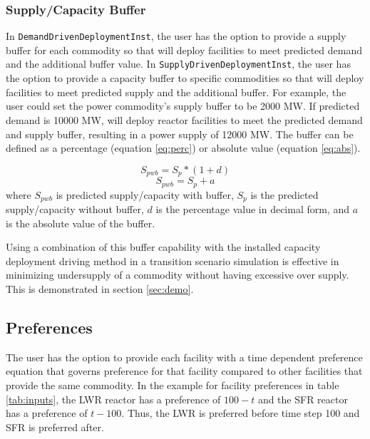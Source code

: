 \subsubsection{Supply/Capacity Buffer}
In \texttt{DemandDrivenDeploymentInst}, the user has the option 
to provide a supply buffer for each commodity so that 
\deploy will deploy facilities to meet predicted demand and the
additional buffer value. 
In \texttt{SupplyDrivenDeploymentInst}, the user has the option 
to provide a capacity buffer to specific commodities so that 
\deploy will deploy facilities to meet predicted supply and the
additional buffer.
For example, the user could set the power commodity's supply buffer 
to be 2000 MW. 
If predicted demand is 10000 MW, \deploy will deploy reactor 
facilities to meet the predicted demand and supply buffer, resulting 
in a power supply of 12000 MW.  
The buffer can be defined as a percentage (equation \ref{eq:perc}) 
or absolute value (equation \ref{eq:abs}). 

\begin{equation}
    \label{eq:perc}
    S_{pwb} = S_{p}*(1+d)
\end{equation}
\begin{equation}
    \label{eq:abs}
    S_{pwb} = S_{p}+a
\end{equation}
where $S_{pwb}$ is predicted supply/capacity with buffer, 
$S_p$ is the predicted supply/capacity without buffer, 
$d$ is the percentage value in decimal form, 
and $a$ is the absolute value of the buffer. 

Using a combination of this buffer capability with the 
installed capacity deployment driving method in a transition 
scenario simulation is effective in minimizing undersupply of a 
commodity without having excessive over supply. 
This is demonstrated in section \ref{sec:demo}. 

\subsection{Preferences}
The user has the option to provide each facility with
a time dependent preference equation that governs preference for 
that facility compared to other facilities that provide the same 
commodity. 
In the example for facility preferences in table \ref{tab:inputs}, 
the \gls{LWR} reactor has a preference of $100-t$ and the 
\gls{SFR} reactor has a preference of $t-100$. 
Thus, the \gls{LWR} is preferred before time step 100 and \gls{SFR}
is preferred after. 

